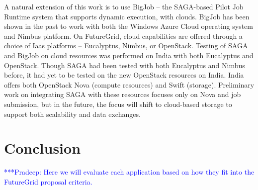 \documentclass[]{paper}
\newcommand{\pmnote}[1]{ {\textcolor{blue} { ***Pradeep: #1 }}}
\newcommand{\pmnote}[1]{}
\begin{document}
A natural extension of this work is to use BigJob -- the SAGA-based Pilot Job Runtime system that supports dynamic execution, with clouds. BigJob has been shown in the past to work with both the Windows Azure Cloud operating system and Nimbus platform. On FutureGrid, cloud capabilities are offered through a choice of Iaas platforms -- Eucalyptus, Nimbus, or OpenStack. Testing of SAGA and BigJob on cloud resources was performed on India with both Eucalyptus and OpenStack. Though SAGA had been tested with both Eucalyptus and Nimbus before, it had yet to be tested on the new OpenStack resources on India. India offers both OpenStack Nova (compute resources) and Swift (storage). Preliminary work on integrating SAGA with these resources focuses only on Nova and job submission, but in the future, the focus will shift to cloud-based storage to support both scalability and data exchanges.




\section{Conclusion}
\pmnote{Here we will evaluate each application based on how they fit into the
FutureGrid proposal criteria.}
\end{document}
